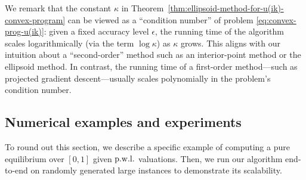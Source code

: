 We remark that the constant $\kappa$ in Theorem~\ref{thm:ellipsoid-method-for-u(ik)-convex-program} can be viewed as a ``condition number'' of problem \eqref{eq:convex-prog-u(ik)}: given a fixed accuracy level $\epsilon$, the running time of the algorithm scales logarithmically (via the term $\log \kappa$) as $\kappa$ grows. 
This aligns with our intuition about a ``second-order'' method such as an interior-point method or the ellipsoid method. 
In contrast, the running time of a first-order method---such as projected gradient descent---usually scales polynomially in the problem's condition number.

\subsection{Numerical examples and experiments} \label{subsec:numerical-examples}
To round out this section, we describe a specific example of computing a pure equilibrium over $[0,1]$ given ${\rm p.w.l.}$ valuations. 
Then, we run our algorithm end-to-end on randomly generated large instances to demonstrate its scalability. 


